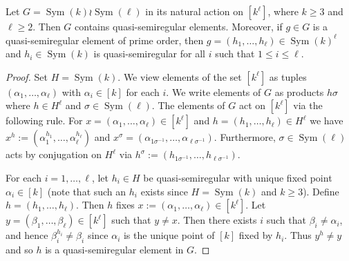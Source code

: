 \documentclass[10pt,a4paper]{amsart}
\DeclareMathOperator{\Sym}{Sym}
\newcommand{\qsres}{quasi-semiregular elements}
\newcommand{\qsre}{quasi-semiregular element}
\newcommand{\qsr}{quasi-semiregular}
\begin{document}
\begin{thm}\label{t:pa}
Let $G= \Sym(k)\wr\Sym(\ell)$ in its natural action on $[k^\ell]$, where $k\geqslant3$ and $\ell\geqslant2$. Then $G$ contains {\qsres}. Moreover, if $g\in G$ is a {\qsre} of prime order, then  $g=(h_1,\ldots,h_\ell)\in \Sym(k)^\ell$ and   $h_i\in \Sym(k)$ is  {\qsr} for all $i$ such that $1\leqslant i\leqslant \ell$.
\end{thm}

\begin{proof}
    Set $H=\Sym(k)$. We view elements of the set   $[k^\ell]$   as tuples $(\alpha_1,\ldots,\alpha_\ell)$ with $\alpha_i\in [k]$ for each $i$. We write elements of $G$ as products $h\sigma $ where $h\in H^\ell$ and $\sigma \in \Sym(\ell)$.  The elements of $G$  act on $[k^\ell]$ via the following rule. For $x=(\alpha_1,\ldots,\alpha_\ell)\in [k^\ell]$ and $h=(h_1,\ldots,h_\ell)\in H^\ell$ we have $x^h :=  (\alpha_1^{h_1},\ldots,\alpha_\ell^{h_\ell})$ and $x^\sigma  = (\alpha_{1\sigma^{-1}},\ldots,\alpha_{\ell\sigma^{-1}})$. Furthermore, $\sigma \in \Sym(\ell)$ acts by conjugation on $ H^\ell$ via $h^\sigma  := (h_{1\sigma^{-1}},\ldots,h_{\ell\sigma^{-1}})$.

    For each $i=1,\dots, \ell$, let  $h_i \in H$ be quasi-semiregular with unique fixed point $\alpha_i \in [k]$ (note that such an $h_i$ exists since $H=\Sym(k)$ and $k\geqslant3$). Define $h=(h_1,\ldots,h_\ell)$. Then $h$ fixes $x:=(\alpha_1,\ldots,\alpha_\ell)\in [k^\ell]$.  Let $y = (\beta_1,\ldots,\beta_\ell) \in  [k^\ell]$  such that $y \neq x$. Then there exists $i$ such that  $\beta_i\neq \alpha_i $, and hence $\beta_i^{h_i} \neq \beta_i$ since $\alpha_i$ is the unique point of $[k]$ fixed by $h_i$. Thus $y^h \neq y$ and so  $h$ is a {{\qsre}} in $G$.


\end{proof}
\end{document}
